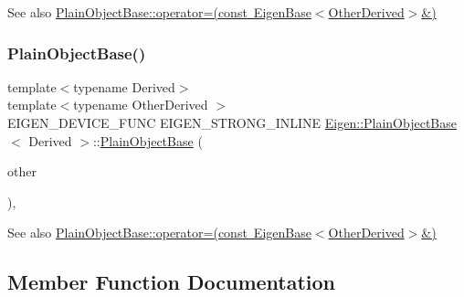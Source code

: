 \begin{DoxySeeAlso}{See also}
\mbox{\hyperlink{class_eigen_1_1_plain_object_base_a6d280056e43429f043e8b25262ee6153}{Plain\+Object\+Base\+::operator=(const Eigen\+Base$<$\+Other\+Derived$>$\&)}} 
\end{DoxySeeAlso}
\mbox{\label{class_eigen_1_1_plain_object_base_a31d65efdbeaf9c7693bf6ae204d788f2}} 
\subsubsection{\texorpdfstring{PlainObjectBase()}{PlainObjectBase()}\hspace{0.1cm}{\footnotesize\ttfamily [3/3]}}
{\footnotesize\ttfamily template$<$typename Derived$>$ \\
template$<$typename Other\+Derived $>$ \\
E\+I\+G\+E\+N\+\_\+\+D\+E\+V\+I\+C\+E\+\_\+\+F\+U\+NC E\+I\+G\+E\+N\+\_\+\+S\+T\+R\+O\+N\+G\+\_\+\+I\+N\+L\+I\+NE \mbox{\hyperlink{class_eigen_1_1_plain_object_base}{Eigen\+::\+Plain\+Object\+Base}}$<$ Derived $>$\+::\mbox{\hyperlink{class_eigen_1_1_plain_object_base}{Plain\+Object\+Base}} (\begin{DoxyParamCaption}\item[{const \mbox{\hyperlink{struct_eigen_1_1_eigen_base}{Eigen\+Base}}$<$ Other\+Derived $>$ \&}]{other }\end{DoxyParamCaption})\hspace{0.3cm}{\ttfamily [inline]}, {\ttfamily [protected]}}

\begin{DoxySeeAlso}{See also}
\mbox{\hyperlink{class_eigen_1_1_plain_object_base_a6d280056e43429f043e8b25262ee6153}{Plain\+Object\+Base\+::operator=(const Eigen\+Base$<$\+Other\+Derived$>$\&)}} 
\end{DoxySeeAlso}


\subsection{Member Function Documentation}
\mbox{\label{class_eigen_1_1_plain_object_base_aa77dab5e9e6ba9e39740e17cfae78a33}} 
